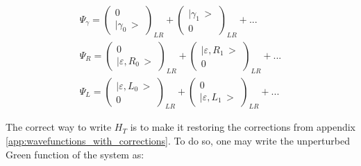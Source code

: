 \begin{gather}
	\Psi_{\gamma}=\begin{pmatrix}0\\
	\big|\gamma_{0}\,\big>
	\end{pmatrix}_{LR}+\begin{pmatrix}\big|\gamma_{1}\,\big>\\
	0
	\end{pmatrix}_{LR}+...\\\Psi_{R}=\begin{pmatrix}0\\
	\big|\varepsilon,R_{0}\,\big>
	\end{pmatrix}_{LR}+\begin{pmatrix}\big|\varepsilon,R_{1}\,\big>\\
	0
	\end{pmatrix}_{LR}+...\\\Psi_{L}=\begin{pmatrix}\big|\varepsilon,L_{0}\,\big>\\
	0
	\end{pmatrix}_{LR}+\begin{pmatrix}0\\
	\big|\varepsilon,L_{1}\,\big>
	\end{pmatrix}_{LR}+...
\end{gather}


The correct way to write $ H_T $ is to make it restoring the corrections from appendix \ref{app:wavefunctions_with_corrections}. To do so, one may write the unperturbed Green function of the system as:

